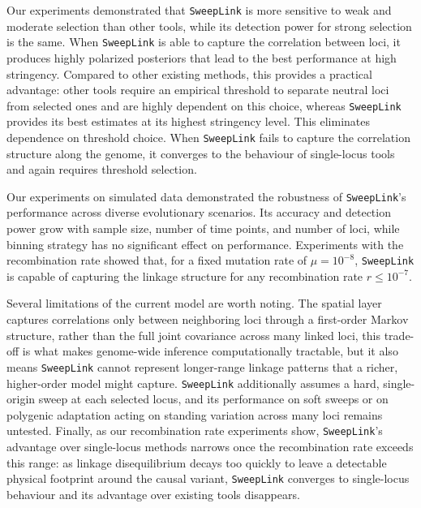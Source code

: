 \documentclass{article}
\newcommand{\SweepLink}{\texttt{SweepLink}\xspace}
\begin{document}
Our experiments demonstrated that \SweepLink is more sensitive to weak and moderate selection than other tools, while its detection power for strong selection is the same.
When \SweepLink is able to capture the correlation between loci, it produces highly polarized posteriors that lead to the best performance at high stringency.
Compared to other existing methods, this provides a practical advantage: other tools require an empirical threshold to separate neutral loci from selected ones and are highly dependent on this choice, whereas \SweepLink provides its best estimates at its highest stringency level.
This eliminates dependence on threshold choice.
When \SweepLink fails to capture the correlation structure along the genome, it converges to the behaviour of single-locus tools and again requires threshold selection.

Our experiments on simulated data demonstrated the robustness of \SweepLink's performance across diverse evolutionary scenarios. 
Its accuracy and detection power grow with sample size, number of time points, and number of loci, while binning strategy has no significant effect on performance.
Experiments with the recombination rate showed that, for a fixed mutation rate of $\mu=10^{-8}$, \SweepLink is capable of capturing the linkage structure for any recombination rate $r \leq 10^{-7}$.

Several limitations of the current model are worth noting.
The spatial layer captures correlations only between neighboring loci through a first-order Markov structure, rather than the full joint covariance across many linked loci, this trade-off is what makes genome-wide inference computationally tractable, but it also means \SweepLink cannot represent longer-range linkage patterns that a richer, higher-order model might capture.
\SweepLink additionally assumes a hard, single-origin sweep at each selected locus, and its performance on soft sweeps or on polygenic adaptation acting on standing variation across many loci remains untested.
Finally, as our recombination rate experiments show, \SweepLink's advantage over single-locus methods narrows once the recombination rate exceeds this range: as linkage disequilibrium decays too quickly to leave a detectable physical footprint around the causal variant, \SweepLink converges to single-locus behaviour and its advantage over existing tools disappears.
\end{document}
